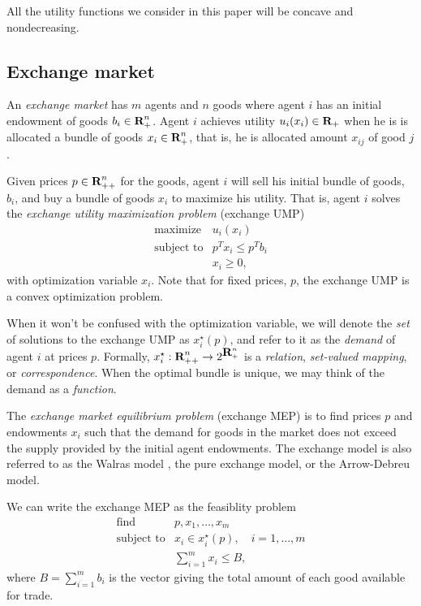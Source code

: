 \documentclass[12pt]{article}
\begin{document}
All the utility functions we consider in this paper will
be concave and nondecreasing.

\subsection{Exchange market}
An \emph{exchange market} has $m$ agents and $n$ goods where
agent $i$ has an initial endowment of goods $b_i \in {\mbox{\bf R}}_+^n$.
Agent $i$ achieves utility $u_i(x_i) \in {\mbox{\bf R}}_+$ when he is is allocated a
bundle of goods $x_i \in {\mbox{\bf R}}^n_{+}$,
that is, he is allocated amount $x_{ij}$ of good $j$.

Given prices $p \in {\mbox{\bf R}}^n_{++}$ for the goods, agent $i$ will sell his
initial bundle of goods, $b_i$, and buy a bundle of goods
$x_i$ to maximize his utility.
That is, agent $i$ solves the \emph{exchange utility maximization problem} (exchange UMP)
\begin{equation}
\label{p-ump}
\begin{array}{ll}
\mbox{maximize} & u_i(x_i) \\
\mbox{subject to} & p^T x_i \leq p^T b_i \\
& x_i \geq 0,
\end{array}
\end{equation}
with optimization variable $x_i$. Note that for fixed prices, $p$, the exchange UMP is a convex optimization problem.

When it won't be confused with the optimization variable,
we will denote the \emph{set} of solutions to the exchange UMP as $x^\star_i(p)$,
and refer to it as the \emph{demand} of agent $i$ at prices $p$.
Formally, $x_i^\star : {\mbox{\bf R}}^n_{++} \to 2^{{\mbox{\bf R}}^n_+}$ is a
\emph{relation}, \emph{set-valued mapping}, or \emph{correspondence}.
When the optimal bundle is unique, we may think of
the demand as a \emph{function}.

The \emph{exchange market equilibrium problem} (exchange MEP) is to find prices $p$ and endowments $x_i$
such that the demand for goods in the market does not exceed the supply
provided by the initial agent endowments.
The exchange model is also referred to as the Walras model \cite{walras1896elements},
the pure exchange model, or the Arrow-Debreu model.

We can write the exchange MEP as the feasiblity problem
\begin{equation}
\label{p-mep}
\begin{array}{ll}
\mbox{find} & p, x_1, \ldots, x_m \\
\mbox{subject to} & x_i \in x_i^\star(p),\quad i = 1,\ldots, m \\
& \sum_{i=1}^m x_i \leq B,
\end{array}
\end{equation}
where $B = \sum_{i=1}^m b_i$ is the vector giving the total amount of each good
available for trade.
\end{document}
